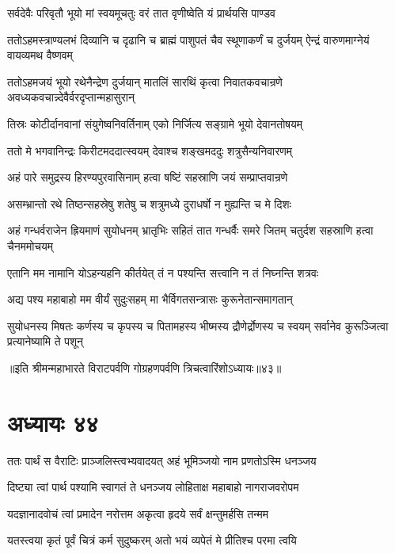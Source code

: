 \twolineshloka
{सर्वदेवैः परिवृतौ भूयो मां स्वयमूचतुः}
{वरं तात वृणीष्वेति यं प्रार्थयसि पाण्डव}


\threelineshloka
{ततोऽहमस्त्राण्यलभं दिव्यानि च दृढानि च}
{ब्राह्मं पाशुपतं चैव स्थूणाकर्णं च दुर्जयम्}
{ऐन्द्रं वारुणमाग्नेयं वायव्यमथ वैष्णवम्}


\threelineshloka
{ततोऽहमजयं भूयो रथेनैन्द्रेण दुर्जयान्}
{मातलिं सारथिं कृत्वा निवातकवचान्रणे}
{अवध्यकवचान्न्देवैर्वरदृप्तान्महासुरान्}


\twolineshloka
{तिस्रः कोटीर्दानवानां संयुगेष्वनिवर्तिनाम्}
{एको निर्जित्य सङ्ग्रामे भूयो देवानतोषयम्}


\twolineshloka
{ततो मे भगवानिन्द्रः किरीटमददात्स्वयम्}
{देवाश्च शङ्खमददुः शत्रुसैन्यनिवारणम्}


\twolineshloka
{अहं पारे समुद्रस्य हिरण्यपुरवासिनाम्}
{हत्वा षष्टिं सहस्राणि जयं सम्प्राप्तवान्रणे}


\twolineshloka
{असम्भ्रान्तो रथे तिष्ठन्सहस्रेषु शतेषु च}
{शत्रुमध्ये दुराधर्षो न मुह्यन्ति च मे दिशः}


\threelineshloka
{अहं गन्धर्वराजेन ह्रियमाणं सुयोधनम्}
{भ्रातृभिः सहितं तात गन्धर्वैः समरे जितम्}
{चतुर्दश सहस्राणि हत्वा चैनममोचयम्}


\twolineshloka
{एतानि मम नामानि योऽहन्यहनि कीर्तयेत्}
{तं न पश्यन्ति सत्त्वानि न तं निघ्नन्ति शत्रवः}


\twolineshloka
{अद्य पश्य महाबाहो मम वीर्यं सुदुःसहम्}
{मा भैर्विगतसन्त्रासः कुरूनेतान्समागतान्}


\threelineshloka
{सुयोधनस्य मिषतः कर्णस्य च कृपस्य च}
{पितामहस्य भीष्मस्य द्रौणेर्द्रोणस्य च स्वयम्}
{सर्वानेव कुरूञ्जित्वा प्रत्यानेष्यामि ते पशून्}

॥इति श्रीमन्महाभारते विराटपर्वणि गोग्रहणपर्वणि त्रिचत्वारिंशोऽध्यायः॥४३॥

\chapter{अध्यायः ४४}

\twolineshloka
{ततः पार्थं स वैराटिः प्राञ्जलिस्त्वभ्यवादयत्}
{अहं भूमिञ्जयो नाम प्रणतोऽस्मि धनञ्जय}


\twolineshloka
{दिष्ट्या त्वां पार्थ पश्यामि स्वागतं ते धनञ्जय}
{लोहिताक्ष महाबाहो नागराजवरोपम}


\twolineshloka
{यदज्ञानादवोचं त्वां प्रमादेन नरोत्तम}
{अकृत्वा हृदये सर्वं क्षन्तुमर्हसि तन्मम}


\twolineshloka
{यतस्त्वया कृतं पूर्वं चित्रं कर्म सुदुष्करम्}
{अतो भयं व्यपेतं मे प्रीतिश्च परमा त्वयि}


